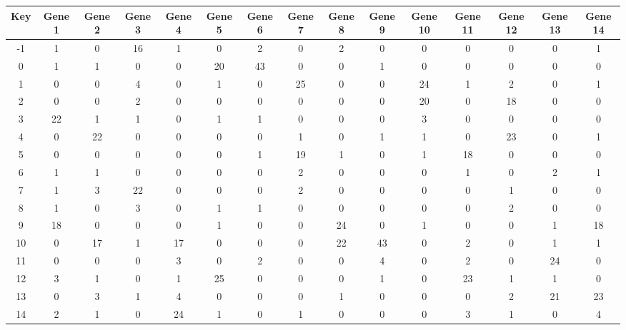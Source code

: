 \begin{tabular}{|c|c|c|c|c|c|c|c|c|c|c|c|c|c|c|}
\hline
Key & Gene 1 & Gene 2 & Gene 3 & Gene 4 & Gene 5 & Gene 6 & Gene 7 & Gene 8 & Gene 9 & Gene 10 & Gene 11 & Gene 12 & Gene 13 & Gene 14 \\
\hline
-1 & 1 & 0 & 16 & 1 & 0 & 2 & 0 & 2 & 0 & 0 & 0 & 0 & 0 & 1 \\
0 & 1 & 1 & 0 & 0 & 20 & 43 & 0 & 0 & 1 & 0 & 0 & 0 & 0 & 0 \\
1 & 0 & 0 & 4 & 0 & 1 & 0 & 25 & 0 & 0 & 24 & 1 & 2 & 0 & 1 \\
2 & 0 & 0 & 2 & 0 & 0 & 0 & 0 & 0 & 0 & 20 & 0 & 18 & 0 & 0 \\
3 & 22 & 1 & 1 & 0 & 1 & 1 & 0 & 0 & 0 & 3 & 0 & 0 & 0 & 0 \\
4 & 0 & 22 & 0 & 0 & 0 & 0 & 1 & 0 & 1 & 1 & 0 & 23 & 0 & 1 \\
5 & 0 & 0 & 0 & 0 & 0 & 1 & 19 & 1 & 0 & 1 & 18 & 0 & 0 & 0 \\
6 & 1 & 1 & 0 & 0 & 0 & 0 & 2 & 0 & 0 & 0 & 1 & 0 & 2 & 1 \\
7 & 1 & 3 & 22 & 0 & 0 & 0 & 2 & 0 & 0 & 0 & 0 & 1 & 0 & 0 \\
8 & 1 & 0 & 3 & 0 & 1 & 1 & 0 & 0 & 0 & 0 & 0 & 2 & 0 & 0 \\
9 & 18 & 0 & 0 & 0 & 1 & 0 & 0 & 24 & 0 & 1 & 0 & 0 & 1 & 18 \\
10 & 0 & 17 & 1 & 17 & 0 & 0 & 0 & 22 & 43 & 0 & 2 & 0 & 1 & 1 \\
11 & 0 & 0 & 0 & 3 & 0 & 2 & 0 & 0 & 4 & 0 & 2 & 0 & 24 & 0 \\
12 & 3 & 1 & 0 & 1 & 25 & 0 & 0 & 0 & 1 & 0 & 23 & 1 & 1 & 0 \\
13 & 0 & 3 & 1 & 4 & 0 & 0 & 0 & 1 & 0 & 0 & 0 & 2 & 21 & 23 \\
14 & 2 & 1 & 0 & 24 & 1 & 0 & 1 & 0 & 0 & 0 & 3 & 1 & 0 & 4 \\
\hline
\end{tabular}